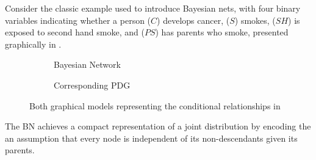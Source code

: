 \documentclass{article}
\newcommand{\MN}{PDG}
\numberwithin{equation}{section}
\begin{document}
\begin{notfocus}
	\begin{example}\label{ex:smoking}
		Consider the classic example used to introduce Bayesian nets, with four binary variables indicating whether a person ($C$) develops cancer, ($S$) smokes, ($SH$) is exposed to second hand smoke, and ($PS$) has parents who smoke, presented graphically in .
		\begin{figure*}[ht!]
			\centering
			
			\begin{subfigure}[b]{0.3\textwidth}
				\scalebox{0.9}{
				\begin{tikzcd}[center base, column sep=1.8em, row sep=1em, dpad={fill opacity=0, draw=gray}, 
					ampersand replacement=\&]
				\& S \ar[dr] \\
				PS \ar[ur]\ar[dr] \&\& C \\
				\& SH \ar[ur]
				\end{tikzcd}}
				\caption{Bayesian Network}
				\label{subfig:smoking-bn}
			\end{subfigure}%
			\hspace{2em}\vline\hspace{2em}
			\begin{subfigure}[b]{0.5\textwidth}
				\caption{Corresponding \MN}
				\label{subfig:smoking-pdg}
			\end{subfigure}
		
			\caption{Both graphical models representing the conditional relationships in }
			\label{fig:smoking-bn+pdg}
		\end{figure*}
		
		The BN achieves a compact representation of a joint distribution by encoding the an assumption that every node is independent of its non-descendants given its parents.
	

\end{example}
\end{notfocus}
\end{document}
